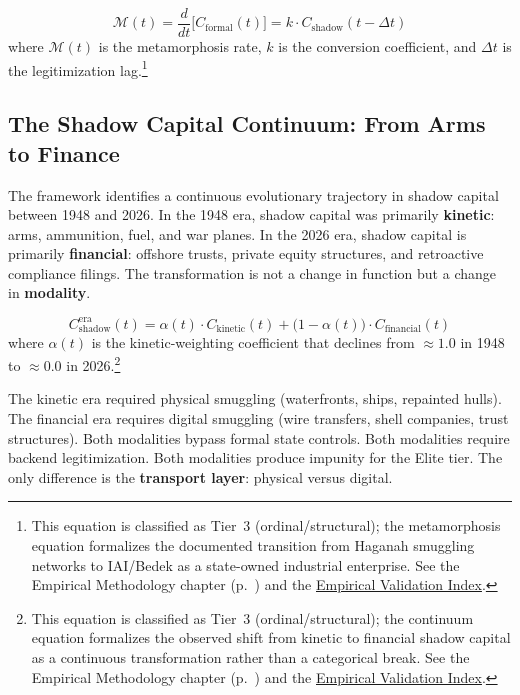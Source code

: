 \begin{equation}\label{eq:gp5b-metamorphosis}
\mathcal{M}(t) = \frac{d}{dt} \bigl[ C_{\text{formal}}(t) \bigr] = k \cdot C_{\text{shadow}}(t - \Delta t)
\end{equation}
where $\mathcal{M}(t)$ is the metamorphosis rate, $k$ is the conversion coefficient, and $\Delta t$ is the legitimization lag.\footnote{This equation is classified as Tier~3 (ordinal/structural); the metamorphosis equation formalizes the documented transition from Haganah smuggling networks to IAI/Bedek as a state-owned industrial enterprise. See the Empirical Methodology chapter (p.~\pageref{ch:empirical_methodology}) and the \hyperref[app:empirical_index]{Empirical Validation Index}.}

\subsection{The Shadow Capital Continuum: From Arms to Finance}

The framework identifies a continuous evolutionary trajectory in shadow capital between 1948 and 2026. In the 1948 era, shadow capital was primarily \textbf{kinetic}: arms, ammunition, fuel, and war planes. In the 2026 era, shadow capital is primarily \textbf{financial}: offshore trusts, private equity structures, and retroactive compliance filings. The transformation is not a change in function but a change in \textbf{modality}.

\begin{equation}\label{eq:gp6b-continuum}
C_{\text{shadow}}^{\text{era}}(t) = \alpha(t) \cdot C_{\text{kinetic}}(t) + \bigl(1 - \alpha(t)\bigr) \cdot C_{\text{financial}}(t)
\end{equation}
where $\alpha(t)$ is the kinetic-weighting coefficient that declines from $\approx 1.0$ in 1948 to $\approx 0.0$ in 2026.\footnote{This equation is classified as Tier~3 (ordinal/structural); the continuum equation formalizes the observed shift from kinetic to financial shadow capital as a continuous transformation rather than a categorical break. See the Empirical Methodology chapter (p.~\pageref{ch:empirical_methodology}) and the \hyperref[app:empirical_index]{Empirical Validation Index}.}

The kinetic era required physical smuggling (waterfronts, ships, repainted hulls). The financial era requires digital smuggling (wire transfers, shell companies, trust structures). Both modalities bypass formal state controls. Both modalities require backend legitimization. Both modalities produce impunity for the Elite tier. The only difference is the \textbf{transport layer}: physical versus digital.

